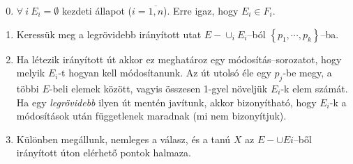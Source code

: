 \begin{enumerate}
	\setcounter{enumi}{-1}
	\item $\forall~i~E_i = \emptyset$ kezdeti állapot ($i=\overline{1,n}$). Erre
	      igaz, hogy $E_i \in F_i$.
	\item Keressük meg a legrövidebb irányított utat $E-\cup_{i}E_i$--ból
	      $\left\{ p_1, \cdots, p_k \right\}$--ba.

	\item Ha létezik irányított út akkor ez meghatároz egy módosítás--sorozatot,
	      hogy melyik $E_i$-t hogyan kell módosítanunk. Az út utolsó éle egy $p_j$-be
	      megy, a többi $E$-beli elemek között, vagyis összesen 1-gyel növeljük
	      $E_i$-k elem számát.  Ha egy {\it legrövidebb} ilyen út mentén javítunk,
	      akkor bizonyítható, hogy $E_i$-k a módosítások után függetlenek maradnak (mi
	      nem bizonyítjuk).
	\item Különben megállunk, nemleges a válasz, és a tanú $X$ az $E- \cup Ei$--ből
	      irányított úton elérhető pontok halmaza.
\end{enumerate}

